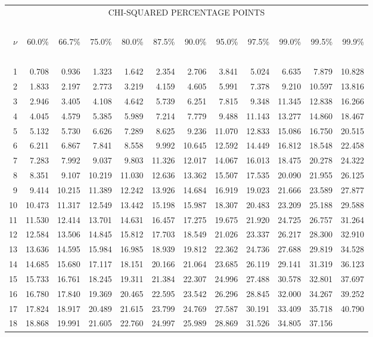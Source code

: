{\begin{center}
\begin{tabular}
      {r@{\ }r@{\ }r@{\ }r@{\ }r@{\ }r@{\ }r@{\ }r@{\ }r@{\ }r@{\ }r@{\ }r}
\multicolumn{12}{c}{CHI-SQUARED PERCENTAGE POINTS}\\
\ \\
$\nu$&60.0\%&66.7\%&75.0\%&80.0\%&87.5\%&90.0\%&95.0\%&97.5\%&99.0\%&99.5\%
     &99.9\%\\
\ \\
1&0.708&0.936&1.323&1.642&2.354&2.706&3.841&5.024&6.635&7.879&10.828\\
2&1.833&2.197&2.773&3.219&4.159&4.605&5.991&7.378&9.210&10.597&13.816\\
3&2.946&3.405&4.108&4.642&5.739&6.251&7.815&9.348&11.345&12.838&16.266\\
4&4.045&4.579&5.385&5.989&7.214&7.779&9.488&11.143&13.277&14.860&18.467\\
5&5.132&5.730&6.626&7.289&8.625&9.236&11.070&12.833&15.086&16.750&20.515\\
6&6.211&6.867&7.841&8.558&9.992&10.645&12.592&14.449&16.812&18.548&22.458\\
7&7.283&7.992&9.037&9.803&11.326&12.017&14.067&16.013&18.475&20.278&24.322\\
8&8.351&9.107&10.219&11.030&12.636&13.362&15.507&17.535&20.090&21.955&26.125\\
9&9.414&10.215&11.389&12.242&13.926&14.684&16.919&19.023&21.666&23.589
 &27.877\\
10&10.473&11.317&12.549&13.442&15.198&15.987&18.307&20.483&23.209&25.188
  &29.588\\
11&11.530&12.414&13.701&14.631&16.457&17.275&19.675&21.920&24.725&26.757
  &31.264\\
12&12.584&13.506&14.845&15.812&17.703&18.549&21.026&23.337&26.217&28.300
  &32.910\\
13&13.636&14.595&15.984&16.985&18.939&19.812&22.362&24.736&27.688&29.819
  &34.528\\
14&14.685&15.680&17.117&18.151&20.166&21.064&23.685&26.119&29.141&31.319
  &36.123\\
15&15.733&16.761&18.245&19.311&21.384&22.307&24.996&27.488&30.578&32.801
  &37.697\\
16&16.780&17.840&19.369&20.465&22.595&23.542&26.296&28.845&32.000&34.267
  &39.252\\
17&17.824&18.917&20.489&21.615&23.799&24.769&27.587&30.191&33.409&35.718
  &40.790\\
18&18.868&19.991&21.605&22.760&24.997&25.989&28.869&31.526&34.805&37.156

\end{tabular}
\end{center}}
